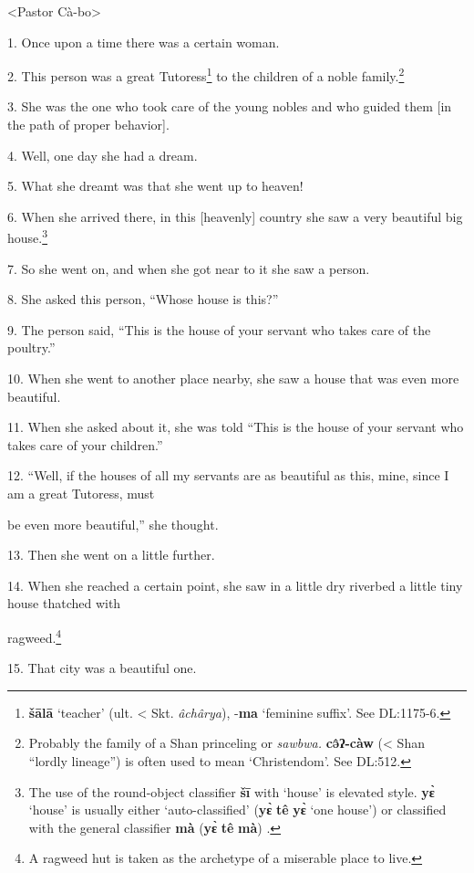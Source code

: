 \setcounter{footnote}{0}

<Pastor Cà-bo>

1. Once upon a time there was a certain woman.

2. This person was a great Tutoress\footnote{\textbf{šālā} `teacher' (ult. < Skt. \textit{âchârya}), -\textbf{ma} `feminine suffix'. See DL:1175-6.} to the children of a noble family.\footnote{Probably the family of a Shan princeling or \textit{sawbwa. }\textbf{cə̂ʔ-càw} (< Shan ``lordly lineage'') is often used to mean `Christendom'. See DL:512.}

3. She was the one who took care of the young nobles and who guided them [in the
path of proper behavior].

4. Well, one day she had a dream.

5. What she dreamt was that she went up to heaven!

6. When she arrived there, in this [heavenly] country she saw a very beautiful
big house.\footnote{The use of the round-object classifier \textbf{šī} with `house' is elevated style. \textbf{yɛ̀} `house' is usually either `auto-classified' (\textbf{yɛ̀} \textbf{tê} \textbf{yɛ̀} `one house') or classified with the general classifier \textbf{mà} (\textbf{yɛ̀} \textbf{tê} \textbf{mà}) .}

7. So she went on, and when she got near to it she saw a person.

8. She asked this person, ``Whose house is this?''

9. The person said, ``This is the house of your servant who takes care of the poultry.''

10. When she went to another place nearby, she saw a house that was even more beautiful.

11. When she asked about it, she was told ``This is the house of your servant who
takes care of your children.''

12. ``Well, if the houses of all my servants are as beautiful as this, mine, since
I am a great Tutoress, must

be even more beautiful,'' she thought.

13. Then she went on a little further.

14. When she reached a certain point, she saw in a little dry riverbed a little
tiny house thatched with

ragweed.\footnote{A ragweed hut is taken as the archetype of a miserable place to live.}

15. That city was a beautiful one.

